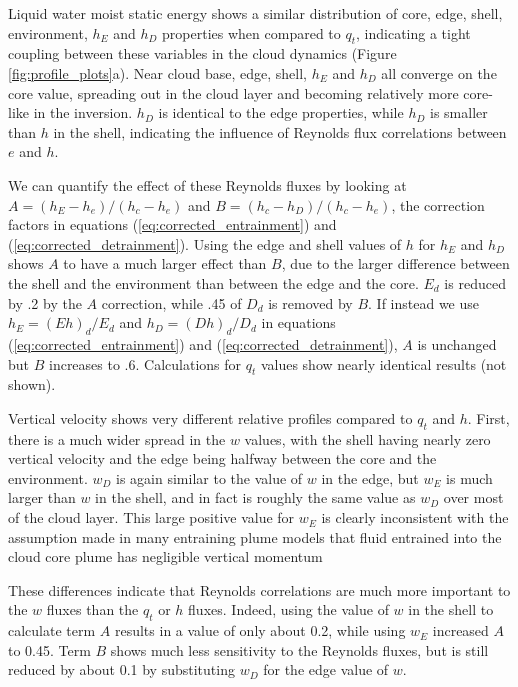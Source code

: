 \documentclass[draft,grl]{agutex}
\begin{document}
\begin{article}
Liquid water moist static energy shows a similar distribution of core, edge, 
shell, environment, $h_E$ and $h_D$ properties when compared to $q_t$, 
indicating a tight coupling between these variables in the cloud dynamics 
(Figure \ref{fig:profile_plots}a).  Near cloud base, edge, shell, $h_E$ and 
$h_D$ all converge on the core value, spreading out in the cloud layer and 
becoming relatively more core-like in the inversion.  $h_D$ is identical to the 
edge properties, while $h_D$ is smaller than $h$ in the shell, indicating the 
influence of Reynolds flux correlations between $e$ and $h$.

We can quantify the effect of these Reynolds fluxes by looking at 
$A = (h_E - h_e)/(h_c - h_e)$ and $B = (h_c - h_D)/(h_c - h_e)$, the correction 
factors in equations (\ref{eq:corrected_entrainment}) and 
(\ref{eq:corrected_detrainment}).  Using the edge and shell values of $h$ for 
$h_E$ and $h_D$ shows $A$ to have a much larger effect than $B$, due to the 
larger difference between the shell and the environment than between the edge 
and the core.  $E_d$ is reduced by .2 by the $A$ correction, while .45 of
$D_d$ is removed by $B$.  If instead we use $h_E = (E h)_d/E_d$ and 
$h_D = (D h)_d/D_d$ in equations (\ref{eq:corrected_entrainment}) and 
(\ref{eq:corrected_detrainment}), $A$ is unchanged but $B$ increases to .6.  
Calculations for $q_t$ values show nearly identical results (not shown).

Vertical velocity shows very different relative profiles compared to
$q_t$ and $h$.  First, there is a much wider spread in the $w$ values,
with the shell having nearly zero vertical velocity and the edge being
halfway between the core and the environment.  $w_D$ is again similar
to the value of $w$ in the edge, but $w_E$ is much larger than $w$ in
the shell, and in fact is roughly the same value as $w_D$ over most of
the cloud layer.  This large positive value for $w_E$ is clearly inconsistent
with the assumption made in many entraining plume models that 
fluid entrained into the cloud core plume has negligible vertical momentum
\citep{Simpson1969,Gregory2001,Siebesma2003}


These differences indicate that Reynolds correlations are much more important 
to the $w$ fluxes than the $q_t$ or $h$ fluxes.  Indeed, using the value 
of $w$ in the shell to calculate term $A$ results in a value of only about 0.2, while
using $w_E$ increased $A$ to 0.45.  Term $B$ shows much less sensitivity to the 
Reynolds fluxes, but is still reduced by about 0.1 by substituting $w_D$ for the 
edge value of $w$.


\end{article}
\end{document}
